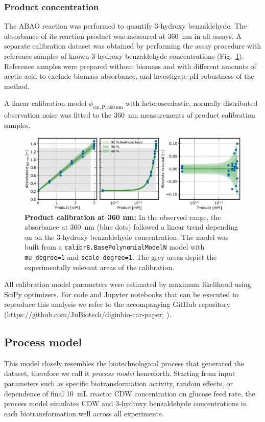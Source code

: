 \documentclass[sn-standardnature]{sn-jnl}%
\theoremstyle{thmstyleone}%
\theoremstyle{thmstyletwo}%
\theoremstyle{thmstylethree}%
\begin{document}
\subsubsection{Product concentration}
The ABAO reaction was performed to quantify 3-hydroxy benzaldehyde.
The absorbance of its reaction product was measured at 360~nm in all assays.
A separate calibration dataset was obtained by performing the assay procedure with reference samples of known 3-hydroxy benzaldehyde concentrations (Fig.~\ref{fig_cmPA360}).
Reference samples were prepared without biomass and with different amounts of acetic acid to exclude biomass absorbance, and investigate pH robustness of the method.

A linear calibration model $\phi_\mathrm{cm,P,360\ nm}$ with heteroscedastic, normally distributed observation noise was fitted to the 360~nm measurements of product calibration samples.

\begin{figure}[H]
    \centering
    \includegraphics[width=1.0\textwidth]{figures/Fig8.eps}
    \caption{
        \textbf{Product calibration at 360 nm:}
        In the observed range, the absorbance at 360~nm (blue dots) followed a linear trend depending on on the 3-hydroxy benzaldehyde concentration.
        The model was built from a \texttt{calibr8.BasePolynomialModelN} model with \texttt{mu\_degree=1} and \texttt{scale\_degree=1}. 
        The grey areas depict the experimentally relevant areas of the calibration.
    }
    \label{fig_cmPA360}
\end{figure}

All calibration model parameters were estimated by maximum likelihood using SciPy optimizers.
For code and Jupyter notebooks that can be executed to reproduce this analysis we refer to the accompanying GitHub repository (https://github.com/JuBiotech/diginbio-car-paper, \cite{manuscriptSI}).


\subsection{Process model}
This model closely resembles the biotechnological process that generated the dataset, therefore we call it \textit{process model} henceforth.
Starting from input parameters such as specific biotransformation activity, random effects, or dependence of final 10~mL reactor CDW concentration on glucose feed rate, the process model simulates CDW and 3-hydroxy benzaldehyde concentrations in each biotransformation well across all experiments.
\end{document}
